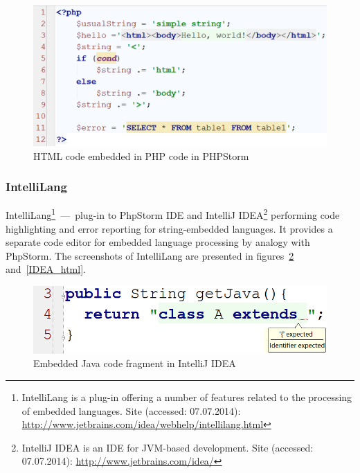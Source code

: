 \documentclass{acm_proc_article-sp}
\begin{document}
\begin{figure}[h!]
    \begin{center}
        \includegraphics[scale=0.30]{graphics/PHPStorm.png}
    \end{center}
    \caption{HTML code embedded in PHP code in PHPStorm}
    \label{PHPStorm}
\end{figure} 

\subsubsection{IntelliLang}

IntelliLang\footnote{IntelliLang is a plug-in offering a number of features related to the processing of embedded languages. Site (accessed: 07.07.2014): \url{ http://www.jetbrains.com/idea/webhelp/intellilang.html}}~---~plug-in to PhpStorm IDE and IntelliJ IDEA\footnote{IntelliJ IDEA is an IDE for JVM-based development. Site (accessed: 07.07.2014): \url{http://www.jetbrains.com/idea/}} performing code highlighting and error reporting for string-embedded languages. It provides a separate code editor for embedded language processing by analogy with PhpStorm. The screenshots of IntelliLang are presented in figures~\ref{error_IDEA} and~\ref{IDEA_html}.

\begin{figure}[h!]
    \begin{center}
        \includegraphics[scale=0.3]{graphics/error_IDEA.png}
    \end{center}
    \caption{Embedded Java code fragment in IntelliJ IDEA}
    \label{error_IDEA}
\end{figure} 
\end{document}
